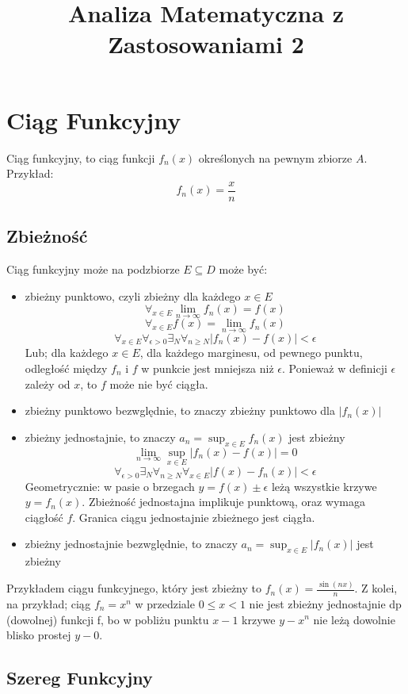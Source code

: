 \documentclass{../notatki}
\title{Analiza Matematyczna z Zastosowaniami 2}
\begin{document}
\section{Ciąg Funkcyjny}

Ciąg funkcyjny, to ciąg funkcji $f_n(x)$ określonych na pewnym zbiorze $A$.
Przykład:
$$
f_n(x) = \frac{x}{n}
$$

\subsection{Zbieżność}

Ciąg funkcyjny może na podzbiorze $E \subseteq D$ może być:
\begin{itemize}
  \item zbieżny punktowo, czyli zbieżny dla każdego $x \in E$
    $$
    \forall_{x \in E} \lim_{n \to \infty} f_n(x) = f(x)
    $$
    $$
    \forall_{x \in E} f(x) = \lim_{n \to \infty} f_n(x)
    $$
    $$
    \forall_{x \in E} \forall_{\epsilon > 0} \exists_{N} \forall_{n
    \ge N} |f_n(x) - f(x)| < \epsilon
    $$
    Lub; dla każdego $x \in E$, dla każdego marginesu, od pewnego
    punktu, odległość między $f_n$ i $f$ w punkcie jest mniejsza niż $\epsilon$.
    Ponieważ w definicji $\epsilon$ zależy od $x$, to $f$ może nie być ciągła.
  \item zbieżny punktowo bezwględnie, to znaczy zbieżny punktowo dla $|f_n(x)|$
  \item zbieżny jednostajnie, to znaczy $a_n = \sup_{x \in E} f_n(x)$
    jest zbieżny
    $$
    \lim_{n \to \infty} \sup_{x \in E} |f_n(x) - f(x)| = 0
    $$
    $$
    \forall_{\epsilon > 0} \exists_{N} \forall_{n \ge N} \forall_{x
    \in E} |f(x) - f_n(x)| < \epsilon
    $$
    Geometrycznie: w pasie o brzegach $y = f(x) \pm \epsilon$ leżą wszystkie
    krzywe $y = f_n(x)$. Zbieżność jednostajna implikuje punktową, oraz
    wymaga ciągłość $f$. Granica ciągu jednostajnie zbieżnego jest ciągła.
  \item zbieżny jednostajnie bezwględnie, to znaczy $a_n = \sup_{x
    \in E} |f_n(x)|$ jest zbieżny
\end{itemize}

Przykładem ciągu funkcyjnego, który jest zbieżny to $f_n(x) =
\frac{\sin(nx)}{n}$. Z kolei, na przykład; ciąg $f_n = x^n$ w przedziale
$0 \le x < 1$ nie jest zbieżny jednostajnie dp (dowolnej) funkcji f, bo w
pobliżu punktu $x - 1$ krzywe $y - x^n$ nie leżą dowolnie blisko prostej
$y - 0$.

\subsection{Szereg Funkcyjny}
\end{document}
